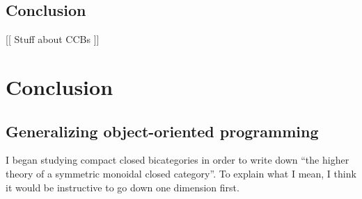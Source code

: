 \documentclass[12pt,twoside,openright]{report}
\begin{document}
\section{Conclusion}

[[ Stuff about CCBs ]]

\chapter*{Conclusion}

\section*{Generalizing object-oriented programming}
I began studying compact closed bicategories in order to write down ``the higher theory of a symmetric monoidal closed category''.  To explain what I mean, I think it would be instructive to go down one dimension first.
\end{document}
